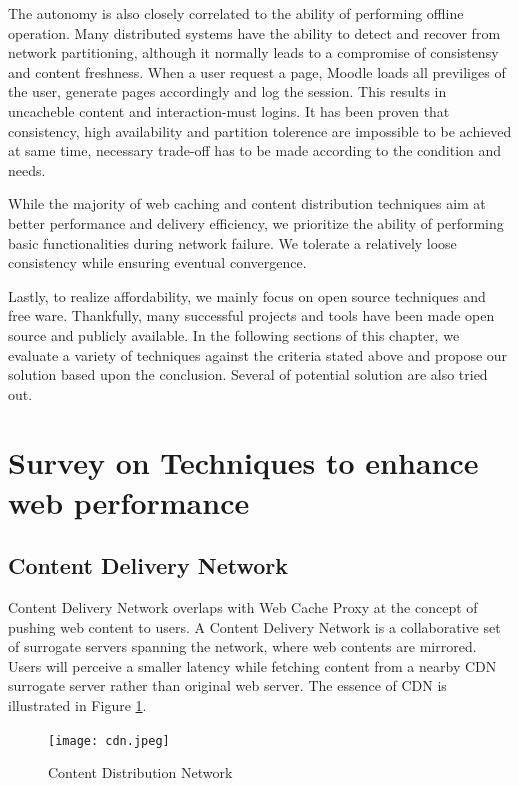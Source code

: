 The autonomy is also closely correlated to the ability of performing offline operation. Many distributed systems have the ability to detect and recover from network partitioning, although it normally leads to a compromise of consistensy and content freshness. When a user request a page, Moodle loads all previliges of the user, generate pages accordingly and log the session. This results in uncacheble content and interaction-must logins. It has been proven that consistency, high availability and partition tolerence are impossible to be achieved at same time\cite{brewer2000towards}\cite{gilbert2002brewer}, necessary trade-off has to be made according to the condition and needs.

While the majority of web caching and content distribution techniques aim at better performance and delivery efficiency, we prioritize the ability of performing basic functionalities during network failure. We tolerate a relatively loose consistency while ensuring eventual convergence.

Lastly, to realize affordability, we mainly focus on open source techniques and free ware. Thankfully, many successful projects and tools have been made open source and publicly available. In the following sections of this chapter, we evaluate a variety of techniques against the criteria stated above and propose our solution based upon the conclusion. Several of potential solution are also tried out.


\section{Survey on Techniques to enhance web performance}

\subsection{Content Delivery Network}
Content Delivery Network overlaps with Web Cache Proxy at the concept of pushing web content to users. A Content Delivery Network is a collaborative set of surrogate servers spanning the network, where web contents are mirrored\cite{pathan2008content}. Users will perceive a smaller latency while fetching content from a nearby CDN surrogate server rather than original web server. The essence of CDN is illustrated in Figure \ref{cdn}.

\begin{figure}[htbp]
\centering
\texttt{[image: cdn.jpeg]}
\caption{Content Distribution Network}
\label{cdn}
\end{figure}

